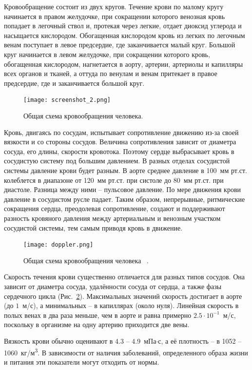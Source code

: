 Кровообращение состоит из двух кругов. Течение крови по малому кругу начинается в правом желудочке, при сокращении которого венозная кровь попадает в легочный ствол и, 
протекая через легкие, отдает диоксид углерода и насыщается кислородом. Обогащенная кислородом кровь из легких по легочным венам 
поступает в левое предсердие, где заканчивается малый круг. Большой круг начинается в левом желудочке, при сокращении которого кровь, 
обогащенная кислородом, нагнетается в аорту, артерии, артериолы и капилляры всех органов и тканей, а оттуда по венулам и венам 
притекает в правое предсердие, где и заканчивается большой круг.

\begin{figure}[h!]
    \centering
    \texttt{[image: screenshot\_2.png]}
    \caption{Общая схема кровообращения человека.}
    \label{tip}
    \end{figure}

Кровь, двигаясь по сосудам, испытывает сопротивление движению из-за своей вязкости и со стороны сосудов. 
Величина сопротивления зависит от диаметра сосуда, его длины, скорости кровотока. Поэтому сердце выбрасывает кровь 
в сосудистую систему под большим давлением. В разных отделах сосудистой системы давление крови будет разным. 
В аорте среднее давление в 100~мм рт.ст. колеблется в диапазоне от 120~мм рт.ст. при систоле до 80~мм рт.ст. при диастоле. 
Разница между ними -- пульсовое давление. По мере движения крови давление в сосудистом русле падает. Таким образом, непрерывные, 
ритмические сокращения сердца, преодолевая сопротивление, создают и поддерживают разность кровяного давления между артериальным и 
венозным участком сосудистой системы, тем самым приводя кровь в движение.


\begin{figure}[h!]
    \centering
    \texttt{[image: doppler.png]}
    \caption{Общая схема кровообращения человека ~\cite{Azhim18}.}
    \label{velosit}
    \end{figure}
Скорость течения крови существенно отличается для разных типов сосудов. Она зависит от диаметра сосуда, удалённости сосуда от сердца,
а также фазы сердечного цикла (Рис.~\ref{velosit}). Максимальных значений скорость достигает в аорте (до \texttilde$1$~м/с), а минимальных --
в капиллярах (около нуля).
Линейная скорость в полых венах в два раза меньше, 
чем в аорте и равна примерно $2.5\cdot10^{-1}$~м/с, поскольку в организме на одну артерию приходится две вены. 

Вязкость крови обычно оценивают в 4.3 -- 4.9~мПа$\cdot$с, а её плотность -- в 1052 -- 1060~кг/м\textsuperscript{3}. 
В зависимости от наличия заболеваний, определенного образа жизни и питания эти показатели могут отходить от нормы. 

